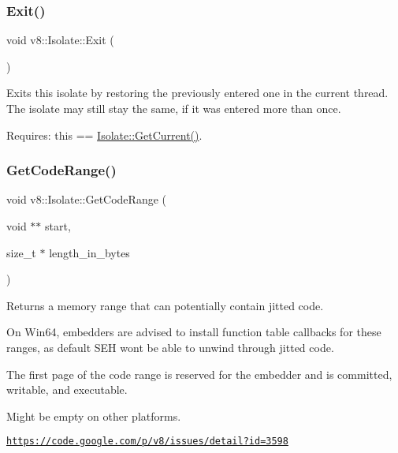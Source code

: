 \subsubsection{\texorpdfstring{Exit()}{Exit()}}
{\footnotesize\ttfamily void v8\+::\+Isolate\+::\+Exit (\begin{DoxyParamCaption}{ }\end{DoxyParamCaption})}

Exits this isolate by restoring the previously entered one in the current thread. The isolate may still stay the same, if it was entered more than once.

Requires\+: this == \mbox{\hyperlink{classv8_1_1Isolate_aa79441b5da4438221d0f38790c4de2ed}{Isolate\+::\+Get\+Current()}}. \mbox{\label{classv8_1_1Isolate_a46c7fb2282970530c32740d7e5999b22}} 
\subsubsection{\texorpdfstring{Get\+Code\+Range()}{GetCodeRange()}}
{\footnotesize\ttfamily void v8\+::\+Isolate\+::\+Get\+Code\+Range (\begin{DoxyParamCaption}\item[{void $\ast$$\ast$}]{start,  }\item[{size\+\_\+t $\ast$}]{length\+\_\+in\+\_\+bytes }\end{DoxyParamCaption})}

Returns a memory range that can potentially contain jitted code.

On Win64, embedders are advised to install function table callbacks for these ranges, as default S\+EH won\textquotesingle{}t be able to unwind through jitted code.

The first page of the code range is reserved for the embedder and is committed, writable, and executable.

Might be empty on other platforms.

\href{https://code.google.com/p/v8/issues/detail?id=3598}{\tt https\+://code.\+google.\+com/p/v8/issues/detail?id=3598} \mbox{\label{classv8_1_1Isolate_aa79441b5da4438221d0f38790c4de2ed}} 
